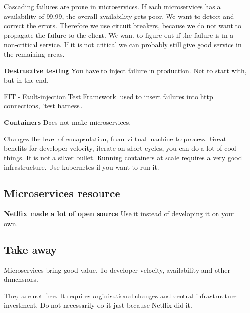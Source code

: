 {Cascading failures are prone in microservices. If each microservices has a availability of 99.99, the overall availability gets poor.
We want to detect and correct the errors. Therefore we use circuit breakers, because we do not want to propagate the failure to the client. 
We want to figure out if the failure is in a non-critical service. If it is not critical we can probably still give good service in the remaining areas.

\textbf{Destructive testing}
You have to inject failure in production. Not to start with, but in the end.

FIT - Fault-injection Test Framework, used to insert failures into http connections, 'test harness'.

\textbf{Containers}
Does not make microservices.

Changes the level of encapsulation, from virtual machine to process.
Great benefits for developer velocity, iterate on short cycles, you can do a lot of cool things. It is not a silver bullet.
Running containers at scale requires a very good infrastructure. Use kubernetes if you want to run it.

\subsection{Microservices resource}
\textbf{Netlfix made a lot of open source}
Use it instead of developing it on your own.

\subsection{Take away}
Microservices bring good value. To developer velocity, availability and other dimensions.

They are not free. It requires orginisational changes and central infrastructure investment. Do not necessarily do it just because Netflix did it.

}


